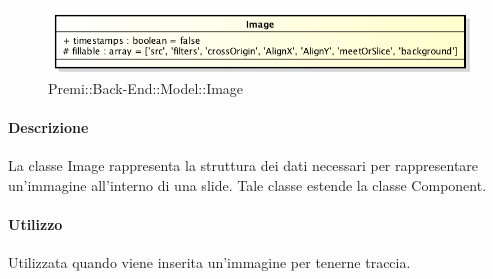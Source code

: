 	\begin{figure}[h]
		\centering
		\includegraphics[width=0.8\linewidth]{img/back_end_premi_model_image}
		\caption[Premi::Back-End::Model::Image]{Premi::Back-End::Model::Image}
		\label{fig:back_end_premi_model_image}
	\end{figure}


	\paragraph{Descrizione}
	La classe Image rappresenta la struttura dei dati necessari per rappresentare un'immagine all'interno di una \gls{slide}. Tale classe estende la classe Component.
	
	\paragraph{Utilizzo}
	Utilizzata quando viene inserita un'immagine per tenerne traccia.
	
